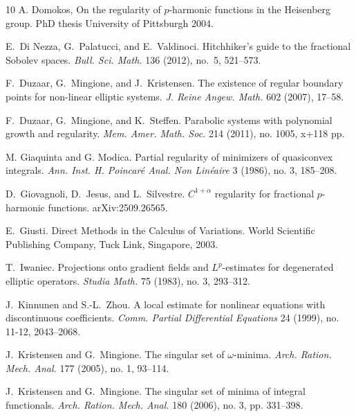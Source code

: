 \documentclass[10pt,letterpaper]{amsart}
\theoremstyle{definition}
\numberwithin{theorem}{section}
\numberwithin{equation}{section}
\newcommand{\1}{\ensuremath{\mathds{1}}}
\numberwithin{equation}{section}
\begin{document}
\begin{thebibliography}{10}
A. Domokos, 
On the regularity of $p$-harmonic functions in the Heisenberg group. PhD thesis University of Pittsburgh 2004. 

\newblock E.~Di Nezza, G.~Palatucci, and E.~Valdinoci.
\newblock Hitchhiker’s guide to the fractional Sobolev spaces. 
\newblock \emph{Bull. Sci. Math.} 136 (2012),  no.~5, 521--573.

\newblock F.~Duzaar, G.~Mingione, and J.~Kristensen.
\newblock The existence of regular boundary points for non-linear elliptic systems. 
\newblock \emph{J. Reine Angew. Math.} 602 (2007), 17--58.

%
\newblock F.~Duzaar, G.~Mingione, and K.~Steffen.
\newblock Parabolic systems with polynomial growth and regularity.
\newblock \emph{Mem. Amer. Math. Soc.} 214 (2011), no. 1005, x+118 pp.

%
\newblock  M. Giaquinta and G. Modica.
\newblock Partial regularity of minimizers of quasiconvex integrals.
\newblock \emph{Ann. Inst. H. Poincar\'e Anal. Non Lin\'eaire} 3 (1986), no. 3, 185--208.

\newblock D.~Giovagnoli, D.~Jesus, and L.~Silvestre.
\newblock $C^{1+\alpha}$ regularity for fractional $p$-harmonic functions.
\newblock arXiv:2509.26565.

E.~Giusti. Direct Methods in the Calculus of Variations. World Scientiﬁc Publishing Company, Tuck Link,
Singapore, 2003.

\newblock T.~Iwaniec.
\newblock Projections onto gradient fields and $L^p$-estimates for degenerated elliptic operators. 
\newblock \emph{Studia Math.} 75 (1983), no. 3, 293--312.

\newblock J.~Kinnunen and S.-L.~Zhou.
\newblock A local estimate for nonlinear equations with discontinuous coefficients.
\newblock \emph{Comm. Partial Differential Equations} 24 (1999), no. 11-12, 2043--2068.

\newblock J.~Kristensen and G.~Mingione.
\newblock The singular set of $\omega$-minima. 
\newblock \emph{Arch. Ration. Mech. Anal.} 177 (2005), no. 1, 93--114.

\newblock J.~Kristensen and G.~Mingione.
\newblock The singular set of minima of integral
functionals. 
\newblock \emph{Arch. Ration. Mech. Anal.} 180 (2006), no. 3, pp. 331--398. 


\end{thebibliography}
\end{document}

